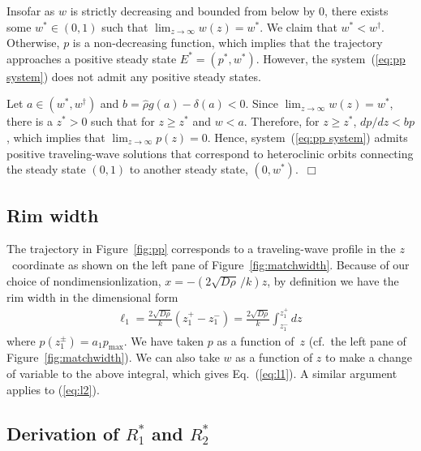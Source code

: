 \documentclass{aims}
\numberwithin{equation}{section}
\begin{document}
Insofar as $w$ is strictly decreasing and bounded from below by 0, 
there exists some $w^*\in(0,1)$ such that $\lim_{z \rightarrow \infty} w(z)=w^*$. 
We claim that $w^*<w^{\dagger}$.
Otherwise, $p$ is a non-decreasing function, which implies that the trajectory approaches a positive steady state $E^*=(p^*, w^*)$.   
However, the system~(\ref{eq:pp system}) does not admit any positive steady states. 

Let $a \in (w^*, w^{\dagger})$ and $b=\hat{\rho}g(a)-\delta(a) <0$.   Since
$\lim_{z \rightarrow \infty}w(z)=w^*$, there is a $z^*>0$ such that for
$z \geq z^*$ and $w<a$.  Therefore, for $z \geq z^*$, 
$dp/dz <bp$, which implies that $\lim_{z \rightarrow \infty} p(z)=0$.
Hence, system~(\ref{eq:pp system}) admits positive traveling-wave solutions that
correspond to heteroclinic orbits connecting the steady state $(0, 1)$ to 
another steady state, $(0, w^*)$.~$\Box$

\subsection*{Rim width}
The trajectory in Figure~\ref{fig:pp} corresponds to a traveling-wave profile in the
$z$~coordinate as shown on the left pane of Figure~\ref{fig:matchwidth}. Because of our
choice of nondimensionlization, $x=-\left(2 \sqrt{D\rho}\,/k\right) z$, 
by definition we have the rim width in the dimensional form  
\begin{eqnarray}
\ell_1= \frac{2 \sqrt{D\rho}}{k} (z_1^+ - z_1^-) = \frac{2 \sqrt{D\rho}}{k} \int_{z_1^-}^{z_1^+} dz\
\end{eqnarray}
where $p(z^{\pm}_1)=a_1 p_{\max}$.  We have taken $p$ as a function of~$z$
(cf.\ the left pane of Figure~\ref{fig:matchwidth}). We can also take $w$ as a function of
$z$ to make a change of variable to the above integral, which gives Eq.~(\ref{eq:l1}).
A similar argument applies to (\ref{eq:l2}).
 
\subsection*{Derivation of $R_1^*$ and $R_2^*$}
\end{document}
